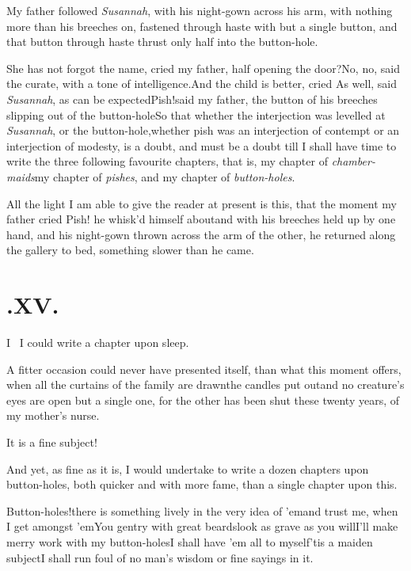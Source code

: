 \documentclass{article}
\begin{document}
My father followed \textit{Susannah}, with his night-gown across
his arm, with nothing more than his breeches on, fastened through
haste with but a single button, and that button through haste
thrust only half into the button-hole.

\tsh She has not forgot the name, cried my father, half
opening the door?\tsk No,
no, said the curate, with a tone of intelligence.\tsk And
the child is better, cried  As well, said \textit{Susannah}, as
can be expected\tsk Pish!\@ said my father, the button of his
breeches slipping out of the button-hole\tsk So that whether
the interjection was levelled at \textit{Susannah}, or the
button-hole,\tsk whether pish was an interjection of contempt
or an interjection of modesty, is a doubt, and must be a
doubt till I shall have time to write the three following
favourite chapters, that is, my chapter of
\textit{chamber-maids}\tsk my chapter of \textit{pishes},
and my chapter of \textit{button-holes}.

All the light I am able to give the reader at present is this,
that the moment my father cried Pish! he whisk’d himself
about\tsk and with his breeches held up by one hand, and his
night-gown thrown across the arm of the other, he returned along the
gallery to bed, something slower than he came.

\medskip
\section{.\enspace XV.}

\lettrine{I}{\ } I could write a chapter upon\break
sleep.

A fitter occasion could never have presented itself, than what
this moment offers, when all the curtains of the family are
drawn\tsk the candles put out\tsk and no creature’s eyes
are open but a single one, for the other has been shut these twenty
years, of my mother’s nurse.

It is a fine subject!

And yet, as fine as it is, I would undertake to write a dozen chapters upon
button-holes, both quicker and with\break
more fame, than a single
chapter upon this.

Button-holes!\tsh there is something lively in the very idea of ’em\tsk and trust me,
when I get amongst ’em\tsk You\break
gentry with great beards\tsh look as\break
grave as you will\tsh I’ll make merry\break
work with my button-holes\tsk I shall have
’em all to myself\tsk ’tis a maiden subject\break\tsk I shall run
foul of no man’s wisdom or fine sayings in it.
\end{document}

